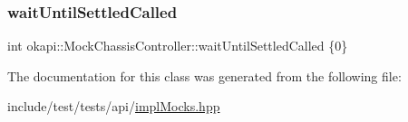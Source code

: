 \mbox{\label{classokapi_1_1MockChassisController_a07d8dd68b0e94d9690d5ef1c3d0e741f}} 
\subsubsection{\texorpdfstring{waitUntilSettledCalled}{waitUntilSettledCalled}}
{\footnotesize\ttfamily int okapi\+::\+Mock\+Chassis\+Controller\+::wait\+Until\+Settled\+Called \{0\}}



The documentation for this class was generated from the following file\+:\begin{DoxyCompactItemize}
\item 
include/test/tests/api/\mbox{\hyperlink{implMocks_8hpp}{impl\+Mocks.\+hpp}}\end{DoxyCompactItemize}
